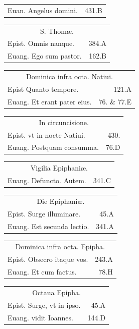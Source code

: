 \documentclass[a5paper,10pt]{book}
\def\ae{æ}
\begin{document}
\begin{multicols}{2}
\begin{tabular}{l r}
Euan. Angelus domini. & 431.B\\
\end{tabular}
\begin{tabular}{l r}
\multicolumn{2}{c}{\color{red} S. Thom\ae .}\\
Epist. Omnis nanque. & 384.A\\
Euang. Ego sum pastor. & 162.B\\
\end{tabular}
\begin{tabular}{l r}
\multicolumn{2}{c}{\color{red} Dominica infra octa. Natiui.}\\
Epist Quanto tempore. & 121.A\\
Euang. Et erant pater eius. & 76. \& 77.E\\%
\end{tabular}
\begin{tabular}{l r}
\multicolumn{2}{c}{\color{red} In circuncisione.}\\
Epist. vt in nocte Natiui. & 430.\\
Euang. Postquam consumma. & 76.D\\
\end{tabular}
\begin{tabular}{l r}
\multicolumn{2}{c}{\color{red} Vigilia Epiphani\ae .}\\
Euang. Defuncto. Autem. & 341.C\\
\end{tabular}
\begin{tabular}{l r}
\multicolumn{2}{c}{\color{red} Die Epiphani\ae .}\\
Epist. Surge illuminare. & 45.A\\
Euang. Est secunda lectio. & 341.A\\
\end{tabular}
\begin{tabular}{l r}
\multicolumn{2}{c}{\color{red} Dominica infra octa. Epipha.}\\
Epist. Obsecro itaque vos. & 243.A\\
Euang. Et cum factus. & 78.H\\
\end{tabular}
\begin{tabular}{l r}
\multicolumn{2}{c}{\color{red} Octaua Epipha.}\\
Epist. Surge, vt in ipso. & 45.A\\
Euang. vidit Ioannes. & 144.D\\
\end{tabular}
\begin{tabular}{l r}

\end{tabular}
\end{multicols}
\end{document}
